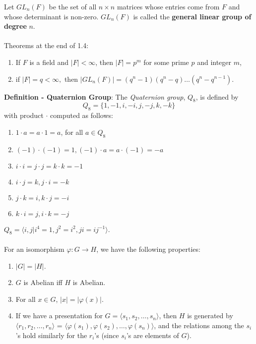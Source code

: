 \documentclass{article}
\begin{document}
Let $GL_n(F)$ be the set of all $n \times n$ matrices whose entries come from $F$ and whose determinant is non-zero. $GL_n(F)$ is called the \textbf{general linear group of degree} $n$. \\ \\
Theorems at the end of 1.4: \begin{enumerate}
    \item If $F$ is a field and $|F| < \infty$, then $|F| = p^m$ for some prime $p$ and integer $m$,
    \item if $|F| = q < \infty,$ then $|GL_n(F)| = (q^n - 1)(q^n - q) \dots (q^n - q^{n - 1})$.
\end{enumerate} $ $ \\ 
\textbf{Definition - Quaternion Group}: The \textit{Quaternion group}, $Q_8$, is defined by $$Q_8 = \{1, -1, i, -i, j, -j, k, -k\}$$ with product $\cdot$ computed as follows: \begin{enumerate}
    \item $1 \cdot a = a \cdot 1 = a$, for all $a \in Q_8$
    \item $(-1) \cdot (-1) = 1, (-1) \cdot a = a \cdot (-1) = -a$
    \item $i \cdot i = j \cdot j = k \cdot k = -1$
    \item $i \cdot j = k, j \cdot i = -k$
    \item $j \cdot k = i, k \cdot j = -i$
    \item $k \cdot i = j, i \cdot k = -j$
\end{enumerate} $ $ \\
$Q_8 = \langle i, j | i^4 = 1, j^2 = i^2, ji = ij^{-1} \rangle$. \\ \\
For an isomorphism $\varphi: G \rightarrow H$, we have the following properties: \begin{enumerate}
    \item $|G| = |H|$.
    \item $G$ is Abelian iff $H$ is Abelian.
    \item For all $x \in G$, $|x| = |\varphi(x)|$.
    \item If we have a presentation for $G = \langle s_1, s_2, \dots, s_n \rangle$, then $H$ is generated by $\langle r_1, r_2, \dots, r_n \rangle $ = $ \langle \varphi(s_1), \varphi(s_2), \dots, \varphi(s_n) \rangle$, and the relations among the $s_i$'s hold similarly for the $r_i$'s (since $s_i$'s are elements of $G$).
\end{enumerate} $ $ \\
\end{document}
